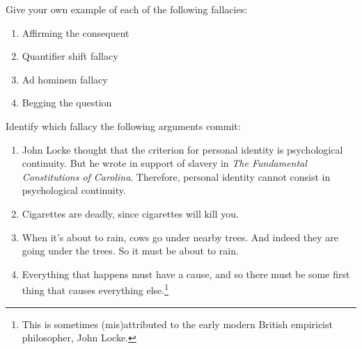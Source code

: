 

\practiceproblems

\problempart Give your own example of each of the following fallacies:
\begin{enumerate}
\item Affirming the consequent
\item Quantifier shift fallacy
\item Ad hominem fallacy
\item Begging the question
\end{enumerate}

\problempart Identify which fallacy the following arguments commit:
\begin{enumerate}
\item John Locke thought that the criterion for personal identity is psychological continuity. But he wrote in support of slavery in \emph{The Fundamental Constitutions of Carolina}. Therefore, personal identity cannot consist in psychological continuity.
\item Cigarettes are deadly, since cigarettes will kill you. 
\item When it's about to rain, cows go under nearby trees. And indeed they are going under the trees. So it must be about to rain.
\item Everything that happens must have a cause, and so there must be some first thing that causes everything else.\footnote{This is sometimes (mis)attributed to the early modern British empiricist philosopher, John Locke.}
\end{enumerate}


